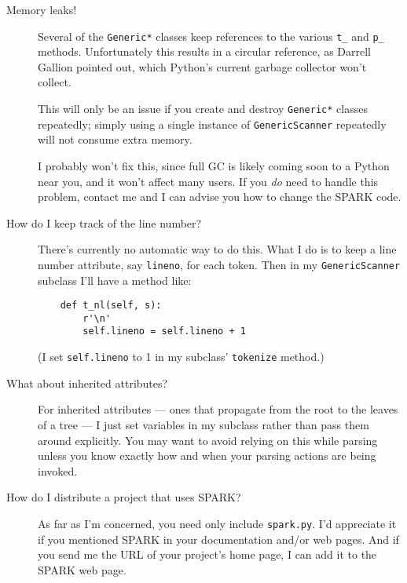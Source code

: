 \documentclass{article}
\newcommand{\code}[1]{\texttt{#1}}
\begin{document}
\begin{description}

\item[Memory leaks!]  Several of the \code{Generic*} classes keep references
	to the various \code{t\_} and \code{p\_} methods.  Unfortunately this
	results in a circular reference, as Darrell Gallion pointed out, which
	Python's current garbage collector won't collect.

	This will only be an issue if you create and destroy \code{Generic*}
	classes repeatedly; simply using a single instance of
	\code{GenericScanner} repeatedly will not consume extra memory.

	I probably won't fix this, since full GC is likely coming soon
	to a Python near you, and it won't affect many users.  If you
	\emph{do} need to handle this problem, contact me and I can advise you
	how to change the SPARK code.

\item[How do I keep track of the line number?]  There's currently no
	automatic way to do this.  What I do is to keep a line
	number attribute, say \code{lineno}, for each token.  Then
	in my \code{GenericScanner} subclass I'll have a method like:
	\begin{verbatim}
	def t_nl(self, s):
	    r'\n'
	    self.lineno = self.lineno + 1
	\end{verbatim}
	(I set \code{self.lineno} to 1 in my subclass' \code{tokenize} method.)

\item[What about inherited attributes?]  For inherited attributes --- ones
	that propagate from the root to the leaves of a tree --- I just set
	variables in my subclass rather than pass them around explicitly.
	You may want to avoid relying on this while parsing unless you
	know exactly how and when your parsing actions are being invoked.

\item[How do I distribute a project that uses SPARK?]  As far as I'm
	concerned, you need only include \code{spark.py}.  I'd appreciate it
	if you mentioned SPARK in your documentation and/or web pages.  And
	if you send me the URL of your project's home page, I can add it
	to the SPARK web page.
\end{description}
\end{document}

